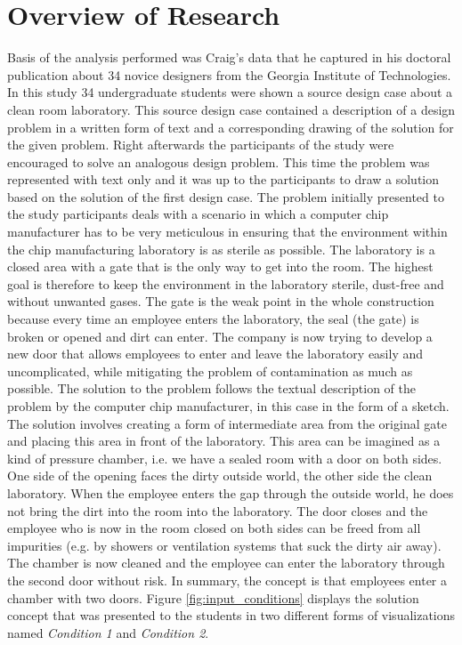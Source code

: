 \documentclass[12pt]{article}
\begin{document}
\section{Overview of Research} %
Basis of the analysis performed was Craig's \cite{craig2001perceptual} %
data that he captured in his doctoral publication about 34 novice designers from the Georgia Institute of Technologies. In this study 34 undergraduate students were shown a source design case about a clean room laboratory. 
This source design case contained a description of a design problem in a written form of text and a corresponding drawing of the solution for the given problem. Right afterwards the participants of the study were encouraged to solve an analogous design problem. This time the problem was represented with text only and it was up to the participants to draw a solution based on the solution of the first design case. %
The problem initially presented to the study participants deals with a scenario in which a computer chip manufacturer has to be very meticulous in ensuring that the environment within the chip manufacturing laboratory is as sterile as possible. The laboratory is a closed area with a gate that is the only way to get into the room. The highest goal is therefore to keep the environment in the laboratory sterile, dust-free and without unwanted gases. The gate is the weak point in the whole construction because every time an employee enters the laboratory, the seal (the gate) is broken or opened and dirt can enter. The company is now trying to develop a new door that allows employees to enter and leave the laboratory easily and uncomplicated, while mitigating the problem of contamination as much as possible. The solution to the problem follows the textual description of the problem by the computer chip manufacturer, in this case in the form of a sketch. The solution involves creating a form of intermediate area from the original gate and placing this area in front of the laboratory. This area can be imagined as a kind of pressure chamber, i.e. we have a sealed room with a door on both sides. One side of the opening faces the dirty outside world, the other side the clean laboratory. When the employee enters the gap through the outside world, he does not bring the dirt into the room into the laboratory. The door closes and the employee who is now in the room closed on both sides can be freed from all impurities (e.g. by showers or ventilation systems that suck the dirty air away). The chamber is now cleaned and the employee can enter the laboratory through the second door without risk. In summary, the concept is that employees enter a chamber with two doors. Figure \ref{fig:input_conditions} displays the solution concept that was presented to the students in two different forms of visualizations named \textit{Condition 1} and \textit{Condition 2}.
\end{document}
